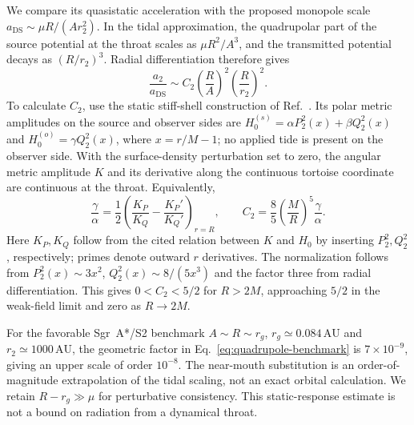 \documentclass[aps,prd,10pt,onecolumn,nofootinbib,superscriptaddress,floatfix]{revtex4-2}
\begin{document}
We compare its quasistatic acceleration with the proposed monopole scale
$a_{\mathrm{DS}}\sim\mu R/(Ar_2^2)$.
In the tidal approximation, the quadrupolar part of the source potential
at the throat scales as $\mu R^2/A^3$, and the transmitted potential
decays as $(R/r_2)^3$.
Radial differentiation therefore gives
\begin{equation}
 \frac{a_2}{a_{\mathrm{DS}}}
 \sim C_2\left(\frac{R}{A}\right)^2
          \left(\frac{R}{r_2}\right)^2.
 \label{eq:quadrupole-benchmark}
\end{equation}
To calculate $C_2$, use the static stiff-shell construction of
Ref.~\cite[Appendix~D.1]{CardosoEtAl2017LoveNumbers}.  Its polar metric
amplitudes on the source and observer sides are
$H_0^{(s)}=\alpha P_2^2(x)+\beta Q_2^2(x)$ and
$H_0^{(o)}=\gamma Q_2^2(x)$, where $x=r/M-1$; no applied tide is present
on the observer side.  With the surface-density perturbation set to zero,
the angular metric amplitude $K$ and its derivative along the continuous
tortoise coordinate are continuous at the throat.  Equivalently,
\begin{equation}
 \frac{\gamma}{\alpha}
 =\frac12\left(\frac{K_P}{K_Q}-\frac{K_P'}{K_Q'}\right)_{r=R},
 \qquad
 C_2=\frac85\left(\frac{M}{R}\right)^5\frac{\gamma}{\alpha}.
 \label{eq:quadrupole-transfer}
\end{equation}
Here $K_P,K_Q$ follow from the cited relation between $K$ and $H_0$ by
inserting $P_2^2,Q_2^2$, respectively; primes denote outward $r$ derivatives.
The normalization follows from $P_2^2(x)\sim3x^2$,
$Q_2^2(x)\sim8/(5x^3)$ and the factor three from radial differentiation.
This gives $0<C_2<5/2$ for $R>2M$, approaching $5/2$ in the weak-field
limit and zero as $R\to2M$.

For the favorable Sgr~A*/S2 benchmark $A\sim R\sim r_g$,
$r_g\simeq0.084\,\mathrm{AU}$ and $r_2\simeq1000\,\mathrm{AU}$,
the geometric factor in Eq.~\eqref{eq:quadrupole-benchmark} is
$7\times10^{-9}$, giving an upper scale of order $10^{-8}$.
The near-mouth substitution is an order-of-magnitude extrapolation of
the tidal scaling, not an exact orbital calculation.
We retain $R-r_g\gg\mu$ for perturbative consistency.
This static-response estimate is not a bound on radiation from a
dynamical throat.



\end{document}
